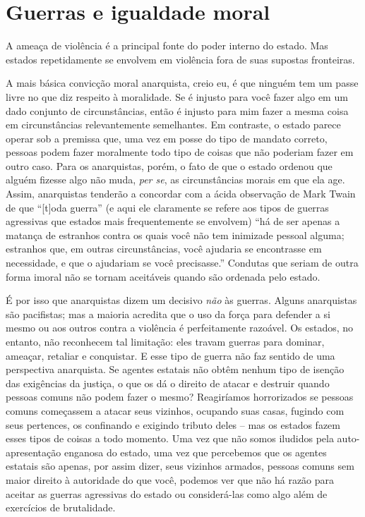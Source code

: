 \section{Guerras e igualdade moral}

A ameaça de violência é a principal fonte do poder interno do estado. Mas estados repetidamente se envolvem em violência fora de suas supostas fronteiras.

A mais básica convicção moral anarquista, creio eu, é que ninguém tem um passe livre no que diz respeito à moralidade. Se é injusto para você fazer algo em um dado conjunto de circunstâncias, então é injusto para mim fazer a mesma coisa em circunstâncias relevantemente semelhantes. Em contraste, o estado parece operar sob a premissa que, uma vez em posse do tipo de mandato correto, pessoas podem fazer moralmente todo tipo de coisas que não poderiam fazer em outro caso. Para os anarquistas, porém, o fato de que o estado ordenou que alguém fizesse algo não muda, \emph{per se}, as circunstâncias morais em que ela age. Assim, anarquistas tenderão a concordar com a ácida observação de Mark Twain de que ``[t]oda guerra'' (e aqui ele claramente se refere aos tipos de guerras agressivas que estados mais frequentemente se envolvem) ``há de ser apenas a matança de estranhos contra os quais você não tem inimizade pessoal alguma; estranhos que, em outras circunstâncias, você ajudaria se encontrasse em necessidade, e que o ajudariam se você precisasse.'' Condutas que seriam de outra forma imoral não se tornam aceitáveis quando são ordenada pelo estado.

É por isso que anarquistas dizem um decisivo \emph{não} às guerras. Alguns anarquistas são pacifistas; mas a maioria acredita que o uso da força para defender a si mesmo ou aos outros contra a violência é perfeitamente razoável. Os estados, no entanto, não reconhecem tal limitação: eles travam guerras para dominar, ameaçar, retaliar e conquistar. E esse tipo de guerra não faz sentido de uma perspectiva anarquista. Se agentes estatais não obtêm nenhum tipo de isenção das exigências da justiça, o que os dá o direito de atacar e destruir quando pessoas comuns não podem fazer o mesmo? Reagiríamos horrorizados se pessoas comuns começassem a atacar seus vizinhos, ocupando suas casas, fugindo com seus pertences, os confinando e exigindo tributo deles -- mas os estados fazem esses tipos de coisas a todo momento. Uma vez que não somos iludidos pela auto-apresentação enganosa do estado, uma vez que percebemos que os agentes estatais são apenas, por assim dizer, seus vizinhos armados, pessoas comuns sem maior direito à autoridade do que você, podemos ver que não há razão para aceitar as guerras agressivas do estado ou considerá-las como algo além de exercícios de brutalidade.

